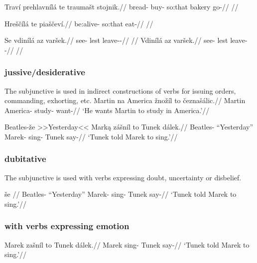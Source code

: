 \pex
\begingl
\gla Traví prehlavnílá te traumašt stojnik.//
\glb bread-\Gen{} buy- {so:that} bakery go-//
\glft {}//
\endgl
\xe

\pex
\begingl
\gla Hreščílá te piaščeví.//
\glb be:alive- {so:that} eat-//
\glft {}//
\endgl
\xe

\pex
\a
\begingl
\gla Se vdinílá az varšek.//
\glb \Refl{} see- {lest} leave-\Av{}-\Pf{}//
\glft {}//
\endgl
\a
\begingl
\gla Vdinílá az varšek.//
\glb see- {lest} leave-\Av{}-\Pf{}//
\glft {}//
\endgl
\xe



\subsubsection{jussive/desiderative}
\par The subjunctive is used in indirect constructions of verbs for issuing orders, commanding, exhorting, etc.
\pex
\begingl
\gla Martin na America žnožíl to čeznašálic.//
\glb Martin \Loc{} America-\Acc{} study-  want-//
\glft `He wants Martin to study in America.'//
\endgl
\xe

\pex
\begingl
\gla Beatles-že >>Yesterday<< Mark\k{a} zášníl to Tunek dálek.//
\glb Beatles-\Gen{} ``Yesterday'' Marek-\Agt{} sing-  Tunek say-//
\glft `Tunek told Marek to sing.'//
\endgl
\xe

\subsubsection{dubitative}
\par The subjunctive is used with verbs expressing doubt, uncertainty or disbelief.

\pex
\begingl
\gla še //
\glb Beatles-\Gen{} ``Yesterday'' Marek-\Agt{} sing-  Tunek say-//
\glft `Tunek told Marek to sing.'//
\endgl
\xe

\subsubsection{with verbs expressing emotion}

\pex
\begingl
\gla Marek zašníl to Tunek dálek.//
\glb Marek sing-  Tunek say-//
\glft `Tunek told Marek to sing.'//
\endgl
\xe


